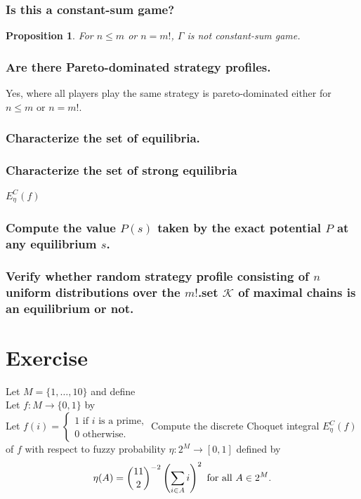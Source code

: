 \documentclass{article}
\newtheorem{prop}{Proposition}
\begin{document}
\subsubsection{Is this a constant-sum game?}
\begin{prop}
 For $n \le m$ or $n = m!$, $\Gamma$ is not constant-sum game. 
\end{prop}


\subsubsection{Are there Pareto-dominated strategy profiles.}
Yes, where all players play the same strategy is pareto-dominated either for $n \le m$ or $n = m!$. 

\subsubsection{Characterize the set of equilibria.}

\subsubsection{Characterize the set of strong equilibria}
$E_{\eta}^C(f)$
\subsubsection{Compute the value $P(s)$ taken by the exact potential $P$ at any equilibrium $s$.}

\subsubsection{Verify whether random strategy profile consisting of $n$ uniform distributions over the $m!$.set $\mathcal{K}$ of maximal chains is an equilibrium or not.}

\section{Exercise}
Let $M=\{1,\ldots,10\}$ and define \\
Let $f:M\rightarrow\{0,1\}$ by \\
Let $f(i)=\left\{\begin{array}{c}
                        1\text{ if }i\text{ is a prime,}\\
                        0\text{ otherwise.}
             \end{array}\right .$
Compute the discrete Choquet integral $E_{\eta}^C(f)$ of $f$ with respect to fuzzy probability $\eta:2^M\rightarrow[0,1]$ defined by
$$\eta(A)=\binom{11}{2}^{-2}\left(\sum_{i\in A}i\right)^2\text{ for all }A\in 2^M\text .$$
\end{document}
